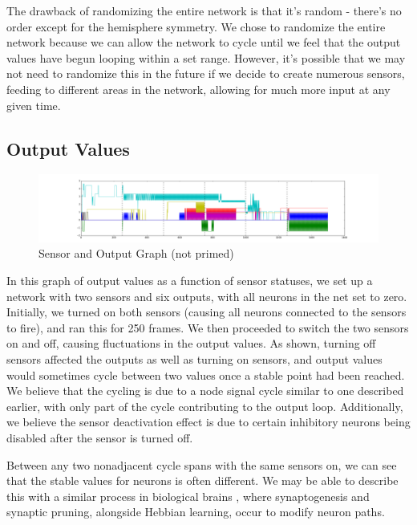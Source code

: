 \documentclass[12pt]{article}
\begin{document}
The drawback of randomizing the entire network is that it's random - there's no order except for the hemisphere symmetry.  We chose to randomize the entire network because we can allow the network to cycle until we feel that the output values have begun looping within a set range.  However, it's possible that we may not need to randomize this in the future if we decide to create numerous sensors, feeding to different areas in the network, allowing for much more input at any given time.

\subsection{Output Values} \label{outputvals}

\begin{figure}[H]
    \includegraphics[width=\linewidth]{../visualizations/8knodes_unrandomized.png}
    \caption{Sensor and Output Graph (not primed)}
    \label{fig:unprimed_sensoroutput_graph}
\end{figure}

In this graph of output values as a function of sensor statuses, we set up a network with two sensors and six outputs, with all neurons in the net set to zero.  Initially, we turned on both sensors (causing all neurons connected to the sensors to fire), and ran this for 250 frames.  We then proceeded to switch the two sensors on and off, causing fluctuations in the output values.  As shown, turning off sensors affected the outputs as well as turning on sensors, and output values would sometimes cycle between two values once a stable point had been reached.  We believe that the cycling is due to a node signal cycle similar to one described earlier, with only part of the cycle contributing to the output loop.  Additionally, we believe the sensor deactivation effect is due to certain inhibitory neurons being disabled after the sensor is turned off.

Between any two nonadjacent cycle spans with the same sensors on, we can see that the stable values for neurons is often different.  We may be able to describe this with a similar process in biological brains \cite{synapticlearning,synapticpruning}, where synaptogenesis and synaptic pruning, alongside Hebbian learning, occur to modify neuron paths. 
\end{document}
